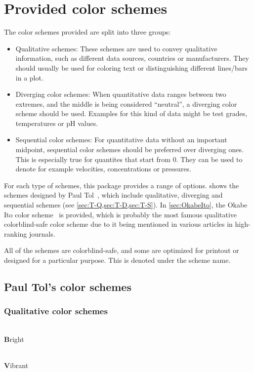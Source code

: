 \documentclass{scrartcl}
\begin{document}
\section{Provided color schemes}\label{sec:colors}
The color schemes provided are split into three groups:
\begin{itemize}
	\item Qualitative schemes:\newline
	      These schemes are used to convey qualitative information, such as different data sources, countries or manufacturers.
	      They should usually be used for coloring text or distinguishing different lines/bars in a plot.
	\item Diverging color schemes:\newline
	      When quantitative data ranges between two extremes, and the middle is being considered ``neutral'', a diverging color scheme should be used.
	      Examples for this kind of data might be test grades, temperatures or pH values.
	\item Sequential color schemes:\newline
	      For quantitative data without an important midpoint, sequential color schemes should be preferred over diverging ones.
	      This is especially true for quantites that start from $0$.
	      They can be used to denote for example velocities, concentrations or pressures.
\end{itemize}

For each type of schemes, this package provides a range of options.
 shows the schemes designed by Paul Tol~\cite{Tol}, which include qualitative, diverging and sequential schemes (see \cref{sec:T-Q,sec:T-D,sec:T-S}).
In \cref{sec:OkabeIto}, the Okabe Ito color scheme~\cite{Ichihara_2008} is provided, which is probably the most famous qualitative colorblind-safe color scheme due to it being mentioned in various articles in high-ranking journals.

All of the schemes are colorblind-safe, and some are optimized for printout or designed for a particular purpose.
This is denoted under the scheme name.\clearpage

\subsection{Paul Tol's color schemes}\label{sec:Tol_schemes}

\subsubsection{Qualitative color schemes}\label{sec:T-Q}
\begin{minipage}{0.5\textwidth}
	\centering
	\\
	\textbf{B}right\\
	\phantom{pb}
\end{minipage}\hfill%
\begin{minipage}{0.5\textwidth}
	\centering
	\\
	\textbf{V}ibrant
\end{minipage}
\end{document}
